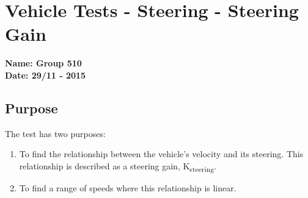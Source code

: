 \pagebreak
\section{Vehicle Tests - Steering - Steering Gain} \label{app:steeringGainTest}
\textbf{Name: Group 510}\\
\textbf{Date: 29/11 - 2015}

\subsection{Purpose}
The test has two purposes:
\begin{enumerate}
\item To find the relationship between the vehicle's velocity and its steering. This relationship is described as a steering gain, \si{K_{steering}}.
\item To find a range of speeds where this relationship is linear.
\end{enumerate}


